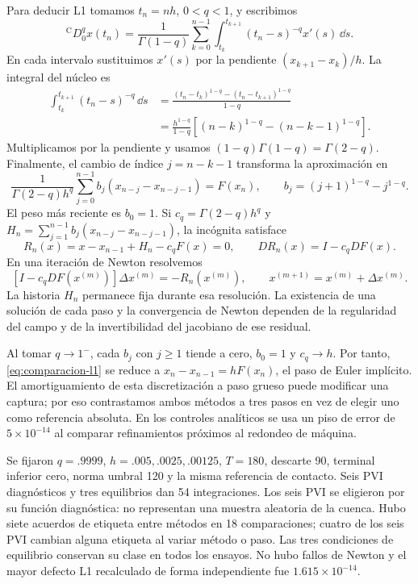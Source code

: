 Para deducir L1 tomamos \(t_n=nh\), \(0<q<1\), y escribimos
\[
 {}^{\mathrm C}D_0^q x(t_n)
 =\frac1{\Gamma(1-q)}\sum_{k=0}^{n-1}
  \int_{t_k}^{t_{k+1}}(t_n-s)^{-q}x'(s)\,\dd s.
\]
En cada intervalo sustituimos \(x'(s)\) por la pendiente
\((x_{k+1}-x_k)/h\). La integral del núcleo es
\begin{align*}
 \int_{t_k}^{t_{k+1}}(t_n-s)^{-q}\,\dd s
 &=\frac{(t_n-t_k)^{1-q}-(t_n-t_{k+1})^{1-q}}{1-q}\\
 &=\frac{h^{1-q}}{1-q}
       [(n-k)^{1-q}-(n-k-1)^{1-q}].
\end{align*}
Multiplicamos por la pendiente y usamos
\((1-q)\Gamma(1-q)=\Gamma(2-q)\). Finalmente, el cambio de índice
\(j=n-k-1\) transforma la aproximación en
\begin{equation}
 \frac1{\Gamma(2-q)h^q}
 \sum_{j=0}^{n-1}b_j(x_{n-j}-x_{n-j-1})=F(x_n),
 \qquad b_j=(j+1)^{1-q}-j^{1-q}.
 \label{eq:comparacion-l1}
\end{equation}
El peso más reciente es \(b_0=1\). Si
\(c_q=\Gamma(2-q)h^q\) y
\(H_n=\sum_{j=1}^{n-1}b_j(x_{n-j}-x_{n-j-1})\), la incógnita satisface
\[
 R_n(x)=x-x_{n-1}+H_n-c_qF(x)=0,\qquad
 DR_n(x)=I-c_qDF(x).
\]
En una iteración de Newton resolvemos
\[
 [I-c_qDF(x^{(m)})]\Delta x^{(m)}=-R_n(x^{(m)}),\qquad
 x^{(m+1)}=x^{(m)}+\Delta x^{(m)}.
\]
La historia \(H_n\) permanece fija durante esa resolución. La existencia
de una solución de cada paso y la convergencia de Newton dependen de la
regularidad del campo y de la invertibilidad del jacobiano de ese residual.

Al tomar \(q\to1^-\), cada \(b_j\) con \(j\geq1\) tiende a cero,
\(b_0=1\) y \(c_q\to h\). Por tanto,
\cref{eq:comparacion-l1} se reduce a
\(x_n-x_{n-1}=hF(x_n)\), el paso de Euler implícito. El amortiguamiento
de esta discretización a paso grueso puede modificar una captura; por eso
contrastamos ambos métodos a tres pasos en vez de elegir uno como
referencia absoluta. En los controles analíticos se usa un piso de error
de \(5\times10^{-14}\) al comparar refinamientos próximos al redondeo
de máquina.

Se fijaron $q=.9999$, $h=.005,.0025,.00125$, $T=180$, descarte 90,
terminal inferior cero, norma umbral 120 y la misma referencia de contacto.
Seis PVI diagnósticos y tres equilibrios dan 54 integraciones.
Los seis PVI se eligieron por su función diagnóstica: no representan una
muestra aleatoria de la cuenca. Hubo siete acuerdos de etiqueta entre
métodos en 18 comparaciones; cuatro de los seis PVI cambian alguna
etiqueta al variar método o paso. Las tres condiciones de equilibrio
conservan su clase en todos los ensayos. No hubo fallos de Newton y el
mayor defecto L1 recalculado de forma independiente fue
$1.615\times10^{-14}$.

